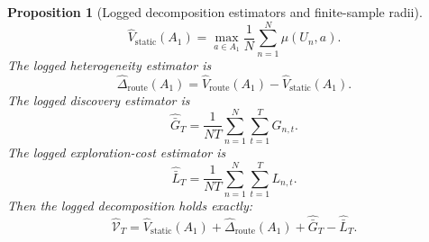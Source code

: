 \documentclass{article} %
\newtheorem{proposition}[theorem]{Proposition}
\begin{document}
\begin{proposition}[Logged decomposition estimators and finite-sample radii]
\begin{equation}
\label{eq:app-six-hat-static}
\widehat V_{\mathrm{static}}(A_1)
=
\max_{a\in A_1}
\frac{1}{N}\sum_{n=1}^{N}\mu(U_n,a).
\end{equation}
The logged heterogeneity estimator is
\begin{equation}
\label{eq:app-six-hat-het}
\widehat\Delta_{\mathrm{route}}(A_1)
=
\widehat V_{\mathrm{route}}(A_1)
-
\widehat V_{\mathrm{static}}(A_1).
\end{equation}
The logged discovery estimator is
\begin{equation}
\label{eq:app-six-hat-G}
\widehat{\bar G}_T
=
\frac{1}{NT}\sum_{n=1}^{N}\sum_{t=1}^{T}G_{n,t}.
\end{equation}
The logged exploration-cost estimator is
\begin{equation}
\label{eq:app-six-hat-L}
\widehat{\bar L}_T
=
\frac{1}{NT}\sum_{n=1}^{N}\sum_{t=1}^{T}L_{n,t}.
\end{equation}
Then the logged decomposition holds exactly:
\begin{equation}
\label{eq:app-six-sample-identity}
\widehat{\mathcal{V}}_T
=
\widehat V_{\mathrm{static}}(A_1)
+
\widehat\Delta_{\mathrm{route}}(A_1)
+
\widehat{\bar G}_T
-
\widehat{\bar L}_T.
\end{equation}


\end{proposition}
\end{document}
